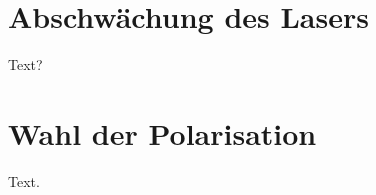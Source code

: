 \appendix
\section{Abschwächung des Lasers}
\label{sec:laser}
Text?

\section{Wahl der Polarisation}
\label{sec:zirkular}
Text.